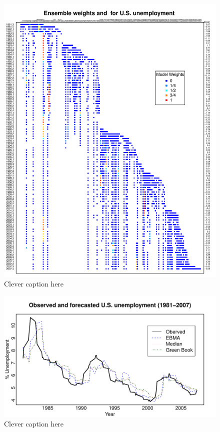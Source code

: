 \documentclass[12pt,fullpage,endnotes]{article}
\begin{document}
\begin{figure}[h!]
\caption{Clever caption here}
\begin{center}
\includegraphics[scale=.95]{awesome}
\end{center}
\end{figure}


\begin{figure}[h!]
\caption{Clever caption here}
\begin{center}
\includegraphics[scale=1]{timeSeries}
\end{center}
\end{figure}
\end{document}
